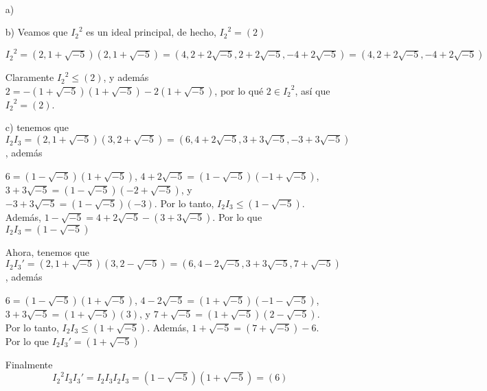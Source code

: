 \begin{problem}[5] \, 
    \newcommand{\sqc}{\sqrt{-5}}
    \begin{enumerate}
        \item[a)] %
        \item[b)] Veamos que ${I_2}^2$ es un ideal principal, de hecho, ${I_2}^2 = (2) $
        
        $ {I_2}^2 = (2, 1 + \sqc) (2, 1 + \sqc) = (4, 2 + 2 \sqc, 2 + 2 \sqc, -4 + 2 \sqc ) = (4, 2 + 2\sqc, -4 + 2 \sqc) $

        Claramente $ {I_2}^2 \leq (2)$, y además $ 2 = -(1+ \sqc)(1+\sqc) - 2(1+\sqc)$, por lo qué $2 \in {I_2}^2$, así que $ {I_2}^2 = (2)$.

        \item[c)] tenemos que $I_2 I_3 = (2, 1 + \sqc)(3, 2 + \sqc) = (6, 4 + 2\sqc, 3 + 3\sqc, -3 + 3 \sqc) $, además 
        
        $ 6 = (1 - \sqc)(1 + \sqc)$, $4 + 2 \sqc = (1 - \sqc)(-1 + \sqc)$, $3 + 3\sqc = (1-\sqc)(-2 + \sqc)$, y $-3 + 3\sqc = (1-\sqc)(-3)$. Por lo tanto, $I_2I_3 \leq (1 - \sqc)$. Además, $1 - \sqc = 4+ 2\sqc - (3 + 3\sqc)$. Por lo que $I_2I_3 = (1 - \sqc)$

        Ahora, tenemos que $I_2 I_3' = (2, 1 + \sqc)(3, 2 - \sqc) = (6, 4 - 2\sqc, 3 + 3\sqc, 7 + \sqc) $, además 
        
        $ 6 = (1 - \sqc)(1 + \sqc)$, $4 - 2 \sqc = (1 + \sqc)(-1 - \sqc)$, $3 + 3\sqc = (1+\sqc)(3)$, y $7 + \sqc = (1+\sqc)(2-\sqc)$. Por lo tanto, $I_2I_3 \leq (1 + \sqc)$. Además, $1 + \sqc = (7+\sqc) - 6$. Por lo que $I_2I_3' = (1 + \sqc)$

        Finalmente $$ {I_2}^2I_3I_3' = I_2 I_3 I_2 I_3 = (1-\sqc)(1+\sqc) = (6)$$
    \end{enumerate}
\end{problem}